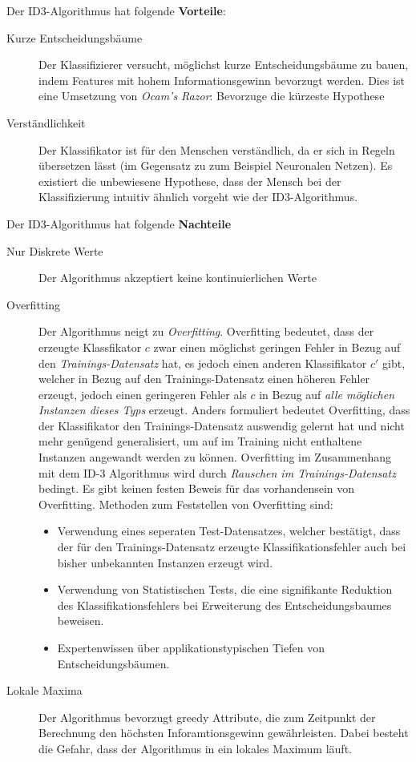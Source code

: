 Der ID3-Algorithmus hat folgende \textbf{Vorteile}:

\begin{description}
	\item[Kurze Entscheidungsbäume] Der Klassifizierer versucht, möglichst kurze Entscheidungsbäume zu bauen, indem Features mit hohem Informationsgewinn bevorzugt werden. Dies ist eine Umsetzung von \emph{Ocam's Razor}: \glqq Bevorzuge die kürzeste Hypothese\grqq{}
	\item[Verständlichkeit]  Der Klassifikator ist für den Menschen verständlich, da er sich in Regeln übersetzen lässt (im Gegensatz zu zum Beispiel Neuronalen Netzen). Es existiert die unbewiesene Hypothese, dass der Mensch bei der Klassifizierung intuitiv ähnlich vorgeht wie der ID3-Algorithmus.\cite[S. 63 - 65]{machine_mitchell}
\end{description}

Der ID3-Algorithmus hat folgende \textbf{Nachteile}
\begin{description}
	\item[Nur Diskrete Werte] Der Algorithmus akzeptiert keine kontinuierlichen Werte \cite[S. 72]{machine_mitchell}
	\item[Overfitting] Der Algorithmus neigt zu \emph{Overfitting}. Overfitting bedeutet, dass der erzeugte Klassfikator $c$ zwar einen möglichst geringen Fehler in Bezug auf den \emph{Trainings-Datensatz} hat, es jedoch einen anderen Klassifikator $c'$ gibt, welcher in Bezug auf den Trainings-Datensatz einen höheren Fehler erzeugt, jedoch einen geringeren Fehler als $c$ in Bezug auf \emph{alle möglichen Instanzen dieses Typs} erzeugt. Anders formuliert bedeutet Overfitting, dass der Klassifikator den Trainings-Datensatz \glqq auswendig gelernt hat\grqq{} und nicht mehr genügend generalisiert, um auf im Training nicht enthaltene Instanzen angewandt werden zu können. Overfitting im Zusammenhang mit dem ID-3 Algorithmus wird durch \emph{Rauschen im Trainings-Datensatz} bedingt. Es gibt keinen festen Beweis für das vorhandensein von Overfitting. Methoden zum Feststellen von Overfitting sind:
	\begin{itemize}
		\item Verwendung eines seperaten Test-Datensatzes, welcher bestätigt, dass der für den Trainings-Datensatz erzeugte Klassifikationsfehler auch bei bisher unbekannten Instanzen erzeugt wird.
		\item Verwendung von Statistischen Tests, die eine signifikante Reduktion des Klassifikationsfehlers bei Erweiterung des Entscheidungsbaumes beweisen.
		\item Expertenwissen über applikationstypischen Tiefen von Entscheidungsbäumen.\cite[S. 66 - 70]{machine_mitchell}
	\end{itemize}
	\item[Lokale Maxima] Der Algorithmus bevorzugt greedy Attribute, die zum Zeitpunkt der Berechnung den höchsten Inforamtionsgewinn gewährleisten. Dabei besteht die Gefahr, dass der Algorithmus in ein lokales Maximum läuft.\cite[S. 66 - 70]{machine_mitchell}
\end{description}

